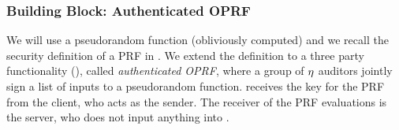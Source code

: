  






\iffalse 
\subsubsection{Building Block: Authenticated OPRF}
%


We will use a pseudorandom function (obliviously computed) and we recall the security definition of a PRF in . We extend the definition to a three party functionality \authOPRFFunc (), called \emph{authenticated OPRF}, where a group of $\eta$ auditors jointly sign a list of inputs to a pseudorandom function. \authOPRFFunc receives the key for the PRF from the client, who acts as the sender. The receiver of the PRF evaluations is the server, who does not input anything into \authOPRFFunc. 

